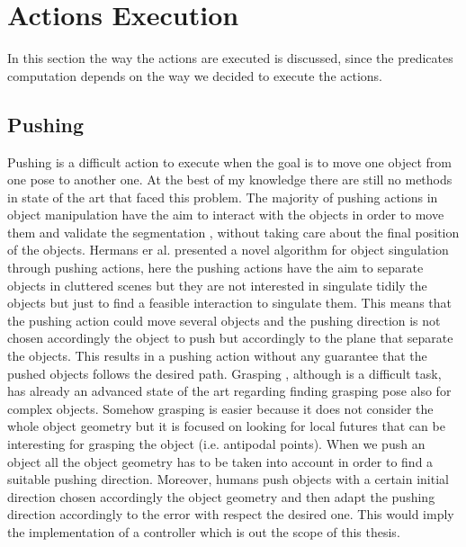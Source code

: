 


\section{Actions Execution}
In this section the way the actions are executed is discussed, since the predicates computation depends on the way we decided to execute the actions.  


\subsection{Pushing}
\label{subsec:pushing}

Pushing is a difficult action to execute when the goal is to move one object from one pose to another one. At the best of my knowledge  there are still no methods in state of the art that faced this problem. The majority of pushing actions in object manipulation have the aim to interact with the objects in order to move them and validate the segmentation \citep{katz2014perceiving} \citep{katz2011interactive} \citep{Katz_2013_7407} , without taking care about the final position of the objects. Hermans er al. \citep{conf/iros/HermansRB12} presented a novel algorithm for object singulation through pushing actions, here the pushing actions have the aim to separate objects in cluttered scenes but they are not interested in singulate tidily the objects but just to find a feasible interaction to singulate them. This means that the pushing action could move several objects and the pushing direction is not chosen accordingly the object to push but accordingly to the plane that separate the objects. This results in a pushing action without any guarantee that the pushed objects follows the desired path. Grasping , although is a difficult task, has already an advanced state of the art regarding finding grasping pose also for complex objects. Somehow grasping is easier because it does not consider the whole object geometry but it is focused on looking for local futures that can be interesting for grasping the object (i.e. antipodal points). When we push an object all the object geometry has to be taken into account in order to find a suitable pushing direction. Moreover, humans push objects with a certain initial direction chosen accordingly the object geometry and then adapt the pushing direction accordingly to the error with respect the desired one. This would imply the implementation of a controller which is out the scope of this thesis. 

